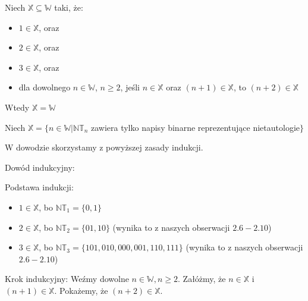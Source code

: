 Niech $\mathbb{X} \subseteq \mathbb{W}$ taki, że:
\begin{itemize}
	\item $1 \in \mathbb{X}$, oraz
	\item $2 \in \mathbb{X}$, oraz
	\item $3 \in \mathbb{X}$, oraz
	\item dla dowolnego $n \in \mathbb{W}$, $n \geq 2$, jeśli $n \in \mathbb{X}$ oraz $(n + 1) \in \mathbb{X}$, to $(n + 2) \in \mathbb{X}$
\end{itemize}
Wtedy $\mathbb{X} = \mathbb{W}$
\n

\noindent
Niech $\mathbb{X} = \{n \in \mathbb{W} | \mathbb{NT}_n$ zawiera tylko napisy binarne reprezentujące nietautologie$\}$
\n

\noindent
W dowodzie skorzystamy z powyższej zasady indukcji.
\n

\noindent
Dowód indukcyjny:
\n

\noindent
Podstawa indukcji:
\begin{itemize}
\item $1 \in \mathbb{X}$, bo $\mathbb{NT}_1 = \{0, 1\}$
\item $2 \in \mathbb{X}$, bo $\mathbb{NT}_2 = \{01, 10\}$ (wynika to z naszych obserwacji $2.6 - 2.10$)
\item $3 \in \mathbb{X}$, bo $\mathbb{NT}_3 = \{101, 010, 000, 001, 110, 111\}$ (wynika to z naszych obserwacji $2.6 - 2.10$)
\end{itemize}

\noindent
Krok indukcyjny:
\n
\noindent
Weźmy dowolne $n \in \mathbb{W}, n \geq 2$. Załóżmy, że $n \in \mathbb{X}$ i $(n + 1) \in \mathbb{X}$. Pokażemy, że $(n + 2) \in \mathbb{X}$.
\n

